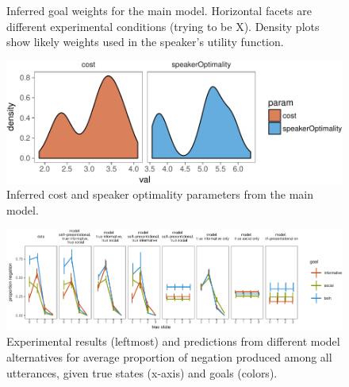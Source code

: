 \documentclass[12pt]{article}
\begin{document}
\begin{figure}
\centering
\caption{\label{fig:goalWeights}Inferred goal weights for the main model. 
Horizontal facets are different experimental conditions (trying to be X). 
Density plots show likely weights used in the speaker's utility function.}
\end{figure}

\begin{figure}
\centering
\includegraphics{fig/params-1.pdf}
\caption{\label{fig:params}Inferred cost and speaker optimality parameters
from the main model.}
\end{figure}

\begin{figure}
\centering
\includegraphics{fig/negationPredictionComp-1.pdf}
\caption{\label{fig:negationPredictionComp}Experimental results (leftmost)
and predictions from different model alternatives for average proportion
of negation produced among all utterances, given true states (x-axis)
and goals (colors).}
\end{figure}
\end{document}
